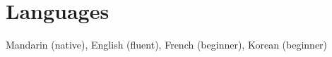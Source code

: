 \documentclass[letterpaper,11pt]{article}
\begin{document}
\section{Languages}
\quad Mandarin ({native}), English ({fluent}), French ({beginner}),  Korean ({beginner})
















\end{document}
